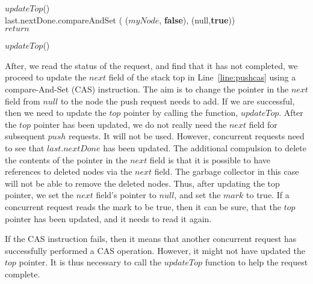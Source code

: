 \documentclass{llncs}
\begin{document}
\begin{algorithm}[!htb]
{{{{						
						 {
							
							$updateTop$()\\
							last.nextDone.compareAndSet ( ($myNode$, \textbf{false}), (null,\textbf{true})) \\
							$return$
						}
					}
				}
					$updateTop$() \label{line:otherupdatetop}
			}
		}

\end{algorithm}
\vspace{-8mm}

After, we read the status of the request, and find that it has not completed, we proceed to update the $next$ 
field of the stack top in Line~\ref{line:pushcas} using a compare-And-Set (CAS) instruction. The aim is to change the pointer in 
the $next$ field from $null$ to the node the push request needs to add. 
If we are successful, then we need to update the $top$ pointer by calling the 
function, $updateTop$. After the $top$ pointer has been updated, we do not really need the $next$ field for 
subsequent $push$ requests. It will not be used. However, concurrent requests need to see that $last.nextDone$ 
has been updated. The additional compulsion to delete the contents of the pointer in the $next$ field is that 
it is possible to have references to deleted nodes via the $next$ field. The garbage collector in this case will 
not be able to remove the deleted nodes. Thus, after updating the top pointer, we set the $next$ field's 
pointer to $null$, and set the $mark$ to true. If a  concurrent request reads the mark to be true, then it can be 
sure, that the $top$ pointer has been updated, and it needs to read it again.

If the CAS instruction fails, then it means that another concurrent request has successfully performed a CAS 
operation. However, it might not have updated the $top$ pointer. It is thus necessary to call the $updateTop$ 
function to help the request complete. 
\end{document}
